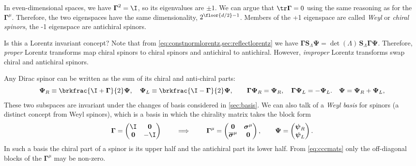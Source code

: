 \documentclass[11pt]{article}
\newcommand{\Gammab}{\boldsymbol{\Gamma}}
\renewcommand{\S}{\mathbf{S}}
\newcommand{\sigmab}{\boldsymbol{\sigma}}
\newcommand{\psib}{\boldsymbol{\psi}}
\newcommand{\Psib}{\boldsymbol{\Psi}}
\begin{document}
In even-dimensional spaces, we have $\Gammab^2 = \I$, so its eigenvalues are $\pm 1$.
We can argue that $\tr \Gammab = 0$ using the same reasoning as for the $\Gammab^\mu$.
Therefore, the two eigenspaces have the same dimensionality, $2^{\floor{d/2}-1}$.
Members of the +1 eigenspace are called \emph{Weyl} or \emph{chiral spinors}, the -1 eigenspace are antichiral spinors.

Is this a Lorentz invariant concept?
Note that from \cref{eq:constnormlorentz,sec:reflectlorentz} we have \(\Gammab \S_\Lambda \Psib = \det (\Lambda)\, \S_\Lambda \Gammab \Psib\).
Therefore, \emph{proper} Lorentz transforms map chiral spinors to chiral spinors and antichiral to antichiral.
However, \emph{improper} Lorentz transforms swap chiral and antichiral spinors.

Any Dirac spinor can be written as the sum of its chiral and anti-chiral parts:
%
\begin{equation}\label{eq:Weylanti}
  \Psib_R \equiv \brkfrac{\I+\Gammab}{2} \Psib,
  \quad
  \Psib_L \equiv \brkfrac{\I-\Gammab}{2} \Psib,
  \qquad
  \Gammab \Psib_R = \Psib_R,
  \quad
  \Gammab \Psib_L = - \Psib_L.
  \quad
  \Psib = \Psib_R + \Psib_L,
\end{equation}
%
These two subspaces are invariant under the changes of basis considered in \cref{sec:basis}.
We can also talk of a \emph{Weyl basis} for spinors (a distinct concept from Weyl spinors), which is a basis in which the chirality matrix takes the block form
%
\begin{equation}\label{eq:weylbasis}
  \Gammab = \begin{pmatrix}
              \I         & \mathbf{0} \\
              \mathbf{0} & -\I        \\
            \end{pmatrix}
  \qquad
  \implies
  \qquad
  \Gammab^\mu = \begin{pmatrix}
                  \mathbf{0} & \sigmab^\mu \\
                  \overline{\sigmab}^\mu & \mathbf{0} \\
                \end{pmatrix}
  ,
  \qquad
  \Psib = \begin{pmatrix}
            \psib_R \\
            \psib_L \\
          \end{pmatrix}
  .
\end{equation}
%
In such a basis the chiral part of a spinor is its upper half and the antichiral part its lower half.
From \cref{eq:cccmats} only the off-diagonal blocks of the $\Gammab^\mu$ may be non-zero.
\end{document}
